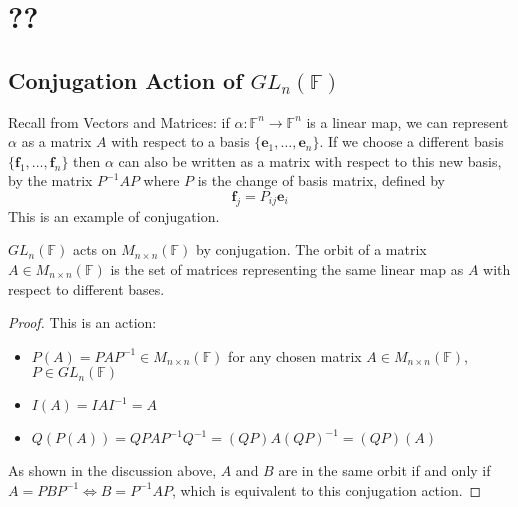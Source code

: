 \documentclass{article}
\begin{document}
\section{??}
\subsection{Conjugation Action of $GL_n(\mathbb F)$}
Recall from Vectors and Matrices: if $\alpha\colon \mathbb F^n \to \mathbb F^n$ is a linear map, we can represent $\alpha$ as a matrix $A$ with respect to a basis $\{ \bm e_1, \dots, \bm e_n \}$. If we choose a different basis $\{ \bm f_1, \dots, \bm f_n \}$ then $\alpha$ can also be written as a matrix with respect to this new basis, by the matrix $P^{-1}AP$ where $P$ is the change of basis matrix, defined by
\[ \bm f_j = P_{ij}\bm e_i \]
This is an example of conjugation.
\begin{proposition}
	$GL_n(\mathbb F)$ acts on $M_{n \times n}(\mathbb F)$ by conjugation. The orbit of a matrix $A \in M_{n \times n}(\mathbb F)$ is the set of matrices representing the same linear map as $A$ with respect to different bases.
\end{proposition}
\begin{proof}
	This is an action:
	\begin{itemize}
		\item $P(A) = PAP^{-1} \in M_{n \times n}(\mathbb F)$ for any chosen matrix $A \in M_{n \times n}(\mathbb F)$, $P \in GL_n(\mathbb F)$
		\item $I(A) = IAI^{-1} = A$
		\item $Q(P(A)) = QPAP^{-1}Q^{-1} = (QP)A(QP)^{-1} = (QP)(A)$
	\end{itemize}
	As shown in the discussion above, $A$ and $B$ are in the same orbit if and only if $A = PBP^{-1} \iff B = P^{-1}AP$, which is equivalent to this conjugation action.
\end{proof}
\end{document}
